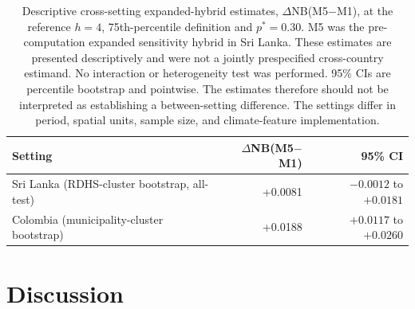 \documentclass[11pt,a4paper]{article}
\begin{document}
\begin{table}[htbp]
\centering
\caption{Descriptive cross-setting expanded-hybrid estimates, $\Delta$NB(M5$-$M1), at the reference $h=4$, 75th-percentile definition and $p^*=0.30$. M5 was the pre-computation expanded sensitivity hybrid in Sri Lanka. These estimates are presented descriptively and were not a jointly prespecified cross-country estimand. No interaction or heterogeneity test was performed. 95\% CIs are percentile bootstrap and pointwise. The estimates therefore should not be interpreted as establishing a between-setting difference. The settings differ in period, spatial units, sample size, and climate-feature implementation.}
\label{tab:crosssetting}
\small
\begin{tabular}{lrr}
\toprule
Setting & $\Delta$NB(M5$-$M1) & 95\% CI \\
\midrule
Sri Lanka (RDHS-cluster bootstrap, all-test) & +0.0081 & $-0.0012$ to $+0.0181$ \\
Colombia (municipality-cluster bootstrap) & +0.0188 & $+0.0117$ to $+0.0260$ \\
\bottomrule
\end{tabular}
\end{table}

\section{Discussion}
\end{document}
